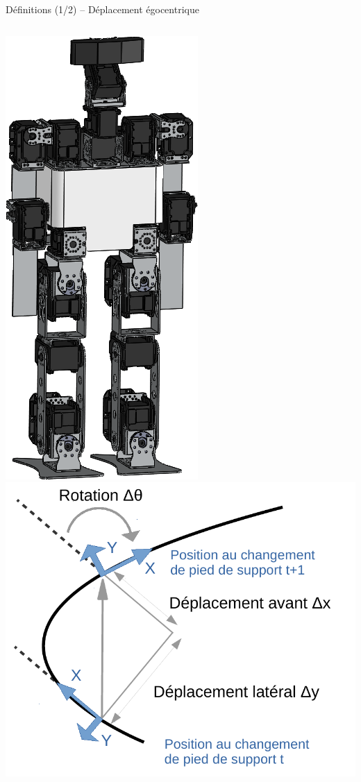 \begin{frame}{Définitions (1/2) -- Déplacement égocentrique}
\begin{columns}
\begin{column}{0.49\textwidth}
            \includegraphics[width=0.25\linewidth]{../media/sigmaban_cao2.png}
            \newline
            \includegraphics[type=pdf,ext=.pdf,read=.pdf,width=0.9\linewidth]{../schema/footstep}
        \end{column}
    \end{columns}
\end{frame}

